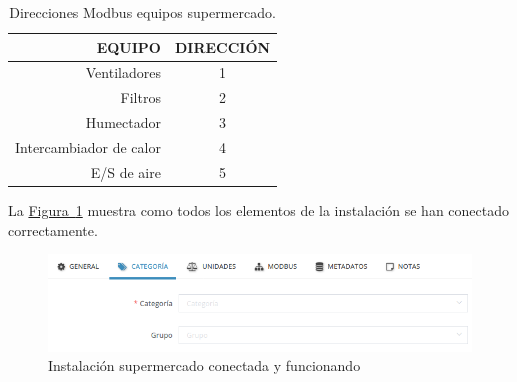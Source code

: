 \begin{table}[H]
  \begin{center}
    \setlength\arrayrulewidth{2pt}
    \begin{tabular}{| r | c |}
      \hhline{|*{2}{-}}
      \cellcolor{lightgray}\textbf{\footnotesize{EQUIPO}} & \cellcolor{lightgray}\textbf{\footnotesize{DIRECCIÓN}}\\ \hline
      \footnotesize{Ventiladores} & 1 \\ \hline
      \footnotesize{Filtros} & 2 \\ \hline
      \footnotesize{Humectador} & 3 \\ \hline
      \footnotesize{Intercambiador de calor} & 4 \\ \hline
      \footnotesize{E/S de aire} & 5 \\ \hline
    \end{tabular}
    \caption{Direcciones Modbus equipos supermercado.}
    \label{tab:direccionesModbus}
  \end{center}
\end{table} 



La \hyperref[figura:instalcionConectada]{Figura~\ref{figura:instalcionConectada}} muestra como todos los elementos de la instalación se han conectado correctamente.



\begin{figure}[H]
  \centering
  \includegraphics[width=\textwidth, keepaspectratio]{img/lib1}
  \caption{Instalación supermercado conectada y funcionando}
  \label{figura:instalcionConectada}
\end{figure}
